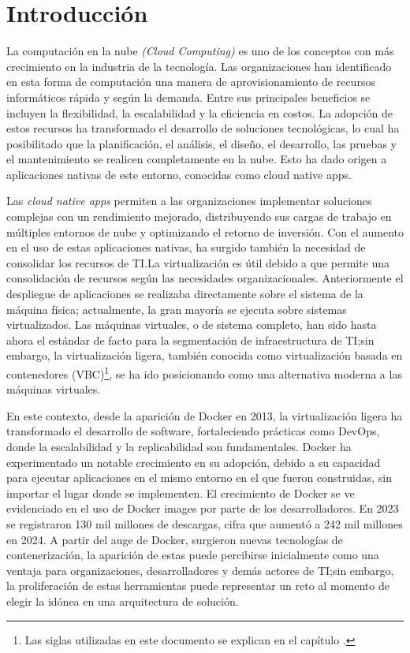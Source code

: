 \chapter*{Introducción}
La computación en la nube \textit{(Cloud Computing)} es uno de los conceptos con más crecimiento en la industria de la tecnología\citep{Jayaweera2024}. Las organizaciones han identificado en esta forma de computación una manera de aprovisionamiento de recursos informáticos rápida y según la demanda. Entre sus principales beneficios se incluyen la flexibilidad, la escalabilidad y la eficiencia en costos\citep{Ahmadi2024}. La adopción de estos recursos ha transformado el desarrollo de soluciones tecnológicas, lo cual ha posibilitado que la planificación, el análisis, el diseño, el desarrollo, las pruebas y el mantenimiento se realicen completamente en la nube. Esto ha dado origen a aplicaciones nativas de este entorno, conocidas como cloud native apps.

Las \textit{cloud native apps} permiten a las organizaciones implementar soluciones complejas con un rendimiento mejorado, distribuyendo sus cargas de trabajo en múltiples entornos de nube y optimizando el retorno de inversión\citep{Alonso2023}. Con el aumento en el uso de estas aplicaciones nativas, ha surgido también la necesidad de consolidar los recursos de TI.\@ La virtualización es útil debido a que permite una consolidación de recursos según las necesidades organizacionales. Anteriormente el despliegue de aplicaciones se realizaba directamente sobre el sistema de la máquina física; actualmente, la gran mayoría se ejecuta sobre sistemas virtualizados\citep{Jain2016}. Las máquinas virtuales, o de sistema completo, han sido hasta ahora el estándar de facto para la segmentación de infraestructura de TI;\@ sin embargo, la virtualización ligera, también conocida como virtualización basada en contenedores (VBC)\footnote{Las siglas utilizadas en este documento se explican en el capítulo .}, se ha ido posicionando como una alternativa moderna a las máquinas virtuales.

En este contexto, desde la aparición de Docker en 2013, la virtualización ligera ha transformado el desarrollo de software, fortaleciendo prácticas como DevOps, donde la escalabilidad y la replicabilidad son fundamentales\citep{Docker2021}. Docker ha experimentado un notable crecimiento en su adopción, debido a su capacidad para ejecutar aplicaciones en el mismo entorno en el que fueron construidas, sin importar el lugar donde se implementen. El crecimiento de Docker se ve evidenciado en el uso de Docker images por parte de los desarrolladores. En 2023 se registraron 130 mil millones de descargas, cifra que aumentó a 242 mil millones en 2024\citep{Docker2024}. A partir del auge de Docker, surgieron nuevas tecnologías de contenerización, la aparición de estas puede percibirse inicialmente como una ventaja para organizaciones, desarrolladores y demás actores de TI;\@ sin embargo, la proliferación de estas herramientas puede representar un reto al momento de elegir la idónea en una arquitectura de solución.

